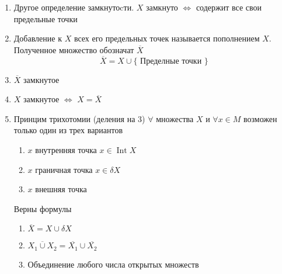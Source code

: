 \documentclass[14pt]{extarticle}
\DeclareMathOperator{\intt}{Int}
\begin{document}
\begin{enumerate}
	\item Другое определение замкнутоcти.  $X$ замкнуто  $\iff$ содержит все свои предельные точки
	\item Добавление к  $X$ всех его предельных точек 
		называется пополнением  $X$. Полученное множество
		обозначат  $\overline{X}$
		 \begin{equation}
			 \overline{X} = X \cup \{\text{~Пределные точки~}\}
		 \end{equation}
	\item $\overline{X}$ замкнутое
	\item $X$ замкнутое  $\iff$  $X = \overline{X}$
	 \item Принцим трихотомии (деления на 3)
		 $\forall $ множества $X$ и  $\forall  x \in M$ 
		 возможен только один из трех вариантов
		 \begin{enumerate}
		 	\item $x$ внутренняя точка $x \in \intt X$
			\item  $x$ граничная точка $x \in \delta X$
			\item  $x$ внешняя точка
		 \end{enumerate}
		Верны формулы
		\begin{enumerate}
			\item $\overline{X} = X \cup \delta X$
			 \item $\overline{X_1 \cup X_2} = \overline{X_1} \cup \overline{X_2}$
		\item Объединение любого числа открытых множеств
		\end{enumerate}
\end{enumerate}
\end{document}
